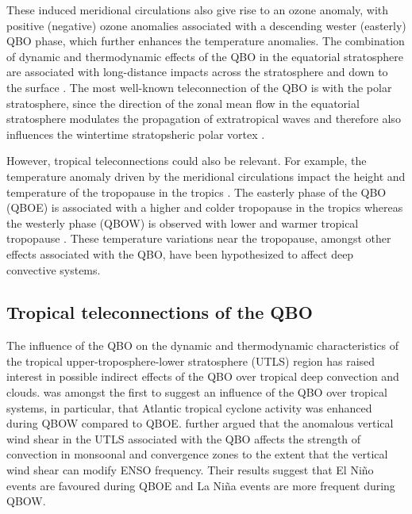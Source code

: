 These induced meridional circulations also give rise to an ozone anomaly, with positive (negative) ozone anomalies associated with a descending wester (easterly) QBO phase, which further enhances the temperature anomalies.
The combination of dynamic and thermodynamic effects of the QBO in the equatorial stratosphere are associated with long-distance impacts across the stratosphere \citep{holton1980,lu2020} and down to the surface \citep{garfinkel2010,gray2018}. The most well-known teleconnection of the QBO is with the polar stratosphere, since the direction of the zonal mean flow in the equatorial stratosphere modulates the propagation of extratropical waves and therefore also influences the wintertime stratopsheric polar vortex \citep{lu2020}.

However, tropical teleconnections could also be relevant. For example, the temperature anomaly driven by the meridional circulations impact the height and temperature of the tropopause in the tropics \citep{baldwin2001,tegtmeier2020,tegtmeier2020b}. 
The easterly phase of the QBO (QBOE) is associated with a higher and colder tropopause in the tropics whereas the westerly phase (QBOW) is observed with lower and warmer tropical tropopause \citep{tegtmeier2020}. These temperature variations near the tropopause, amongst other effects associated with the QBO, have been hypothesized to affect deep convective systems. %





\subsection{Tropical teleconnections of the QBO}\label{sq:trop_qbo}



 The influence of the QBO on the dynamic and thermodynamic characteristics of the tropical upper-troposphere-lower stratosphere  (UTLS) region has raised interest in possible indirect effects of the QBO over tropical deep convection and clouds.
\cite{gray1984} was amongst the first to suggest an influence of the QBO over tropical systems, in particular, that Atlantic tropical cyclone activity was enhanced during QBOW compared to QBOE. 
\cite{gray1992} further argued that the anomalous vertical wind shear in the UTLS associated with the QBO affects the strength of convection in monsoonal and convergence zones to the extent that the vertical wind shear can modify ENSO frequency. Their results suggest that El Niño events are favoured during QBOE and  La Niña events are more frequent during QBOW.

